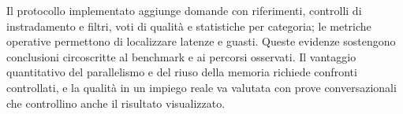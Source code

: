 Il protocollo implementato aggiunge domande con riferimenti, controlli di
instradamento e filtri, voti di qualità e statistiche per categoria; le
metriche operative permettono di localizzare latenze e guasti. Queste evidenze
sostengono conclusioni circoscritte al benchmark e ai percorsi osservati. Il
vantaggio quantitativo del parallelismo e del riuso della memoria richiede
confronti controllati, e la qualità in un impiego reale va valutata con prove
conversazionali che controllino anche il risultato visualizzato.
